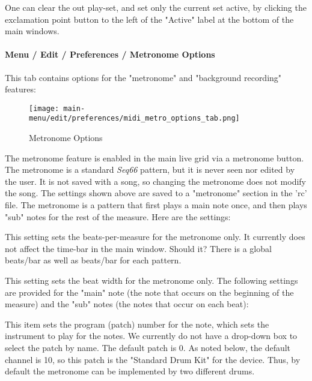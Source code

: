    One can clear the out play-set, and set only the current set active, by
   clicking the exclamation point button to the left of the "Active" label at
   the bottom of the main windows.

\paragraph{Menu / Edit / Preferences / Metronome Options}
\label{paragraph:menu_edit_preferences_metronom_options}

   This tab contains options for the "metronome" and
   "background recording" features:

\begin{figure}[H]
   \centering 
   \texttt{[image: main-menu/edit/preferences/midi\_metro\_options\_tab.png]}
   \caption{Metronome Options}
   \label{fig:midi_metro_options_tab}
\end{figure}

   \setcounter{ItemCounter}{0}      %

   The metronome feature is enabled in the main live grid via a metronome
   button.
   The metronome is a standard \textsl{Seq66} pattern, but it is never seen
   nor edited by the user.
   It is not saved with a song, so changing the metronome does not modify the
   song.
   The settings shown above are saved to a "metronome" section in the 'rc'
   file.
   The metronome is a pattern that first plays a main note once, and then
   plays "sub" notes for the rest of the measure.
   Here are the settings:

   This setting sets the beats-per-measure for the metronome only.
   It currently does not affect the time-bar in the main window.
   Should it? There is a global beats/bar as well as beats/bar for
   each pattern.

   This setting sets the beat width for the metronome only.
   The following settings are provided for the "main" note
   (the note that occurs on the beginning of the measure)
   and the "sub" notes (the notes that occur on each beat):

   This item sets the program (patch) number for the note, which sets the
   instrument to play for the notes.
   We currently do not have a drop-down box to select the patch by name.
   The default patch is 0.
   As noted below, the default channel is 10, so this
   patch is the "Standard Drum Kit" for the device.
   Thus, by default the metronome can be implemented by two different
   drums.


